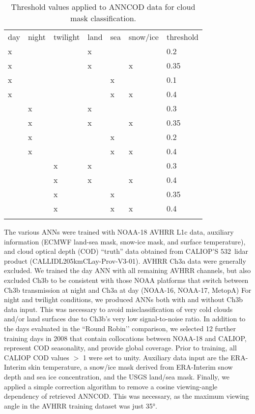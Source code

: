 \begin{table}[h]
  \caption{Threshold values applied to ANNCOD data for cloud mask classification.}
  \begin{tabular}{llllll|l} %
    \tophline
    day & night & twilight & land & sea & snow/ice & threshold \\
    \middlehline
    x   &       &          & x    &     &          & 0.2  \\
    x   &       &          & x    &     & x        & 0.35 \\
    x   &       &          &      & x   &          & 0.1  \\
    x   &       &          &      & x   & x        & 0.4  \\ \middlehline
    & x     &          & x    &     &          & 0.3  \\
    & x     &          & x    &     & x        & 0.35 \\
    & x     &          &      & x   &          & 0.2  \\
    & x     &          &      & x   & x        & 0.4  \\ \middlehline
    &       & x        & x    &     &          & 0.3  \\
    &       & x        & x    &     & x        & 0.4  \\
    &       & x        &      & x   &          & 0.35 \\
    &       & x        &      & x   & x        & 0.4  \\ \bottomhline
  \end{tabular}
  \label{tab:ANN_thresholds}
\end{table}

The various ANNs were trained with NOAA-18 AVHRR L1c data, auxiliary information (ECMWF land-sea mask, snow-ice mask, and surface temperature), and cloud optical depth (COD) ``truth'' data obtained from CALIOP'S 532~\nm lidar product (\mbox{CAL\textunderscore LID\textunderscore L2\textunderscore 05kmCLay-Prov-V3-01}). AVHRR Ch3a data were generally excluded. We trained the day ANN with all remaining AVHRR channels, but also excluded Ch3b to be consistent with those NOAA platforms that switch between Ch3b transmission at night and Ch3a at day (NOAA-16, NOAA-17, MetopA) For night and twilight conditions, we produced ANNs both with and without Ch3b data input. This was necessary to avoid misclassification of very cold clouds and/or land surfaces due to Ch3b's very low signal-to-noise ratio. In addition to the days evaluated in the ``Round Robin’’ comparison, we selected 12 further training days in 2008 that contain collocations between NOAA-18 and CALIOP, represent COD seasonality, and provide global coverage. Prior to training, all CALIOP COD values $\gt$ 1 were set to unity. Auxiliary data input are the ERA-Interim skin temperature, a snow/ice mask derived from ERA-Interim snow depth and sea ice concentration, and the USGS land/sea mask. Finally, we applied a simple correction algorithm to remove a cosine viewing-angle dependency of retrieved ANNCOD. This was necessary, as the maximum viewing angle in the AVHRR training dataset was just 35°.

